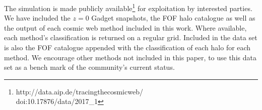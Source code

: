 The simulation is made publicly available\footnote{http://data.aip.de/tracingthecosmicweb/ \\  doi:10.17876/data/2017\_1} for exploitation by interested parties. We have included the $z=0$ Gadget snapshots, the FOF halo catalogue as well as the output of each cosmic web method included in this work. Where available, each method's classification is returned on a regular grid. Included in the data set is also the FOF catalogue appended with the classification of each halo for each method. We encourage other methods not included in this paper, to use this data set as a bench mark of the community's current status.


